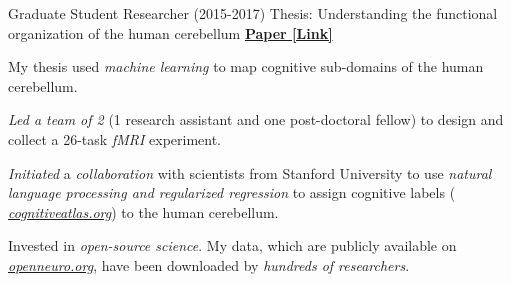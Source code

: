 \begin{cventries}
  \cventry
    {Graduate Student Researcher (2015-2017)} %
    {Thesis: Understanding the functional organization of the human cerebellum}
    {\href{http://ivrylab.berkeley.edu/uploads/4/1/1/5/41152143/functional_boundaries_in_the_human_cerebellum.pdf}{\textbf{Paper [Link]}}}
    {} %
    {
      \begin{cvitems} %
        \item {My thesis used \textit{machine learning} to map cognitive sub-domains of the human cerebellum.}
      	\item {\textit{Led a team of 2} (1 research assistant and one post-doctoral fellow) to design and collect a 26-task \textit{fMRI} experiment.}
      	\item {\textit{Initiated} a \textit{collaboration} with scientists from Stanford University to use \textit{natural language processing and regularized regression} to assign cognitive labels ( {\href{https://cognitiveatlas.org/}{\textit{cognitiveatlas.org}}}) to the human cerebellum.}
      	\item {Invested in \textit{open-source science}. My data, which are publicly available on {\href{https://openneuro.org/datasets/ds002105/versions/1.1.0}{\textit{openneuro.org}}}, have been downloaded by \textit{hundreds of researchers}.}
      \end{cvitems}
    }

\end{cventries}
